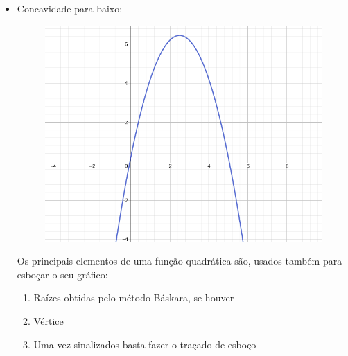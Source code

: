 \begin{multicols*}{2}
\begin{itemize}[wide, labelwidth=!, labelindent=0pt]
\begin{figure}[H]
              \end{figure}
        \item Concavidade para baixo:
              \begin{figure}[H]
                  \centering
                  \includegraphics[scale=0.3]{assets/rafael/img17.png}
              \end{figure}
              Os principais elementos de uma função quadrática são, usados também para esboçar o seu gráfico:
              \begin{enumerate}
                  \item Raízes obtidas pelo método Báskara, se houver
                  \item Vértice
                  \item Uma vez sinalizados basta fazer o traçado de esboço
              \end{enumerate}

\end{itemize}
\end{multicols*}
